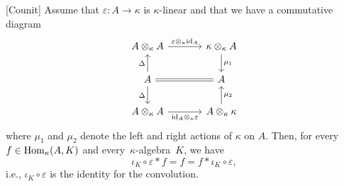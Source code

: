 \begin{lem}\label{lem:*-identity} {\rm[Counit]}
    Assume that\/ $\varepsilon\colon A\to\kappa$ is\/ $\kappa$-linear and that we have a commutative diagram
    \small
    \begin{equation}\label{dgm:*-identity}
        \begin{tikzcd}[column sep=1.2cm]
            A\otimes_\kappa A
                    \arrow[r,"\varepsilon\otimes_\kappa\id_A"]
                &\kappa\otimes_\kappa A
                    \arrow[d,"\mu_1"]\\
            A
                    \arrow[u,"\Delta"]
                    \arrow[d,"\Delta"']
                &A
                    \arrow[l,no head,equal]\\
            A\otimes_\kappa A
                    \arrow[r,"\id_A\otimes_\kappa\varepsilon"']
                &A\otimes_\kappa\kappa
                        \arrow[u,"\mu_2"']
        \end{tikzcd}
    \end{equation}
    \normalsize
    where $\mu_1$ and $\mu_2$ denote the left and right actions of\/ $\kappa$ on $A$. Then, for every\/ $f\in{\rm Hom}_\kappa(A,K)$ and every\/~$\kappa$-algebra\/~$K$, we have
    $$
        \iota_K\circ\varepsilon*f=f=f*\iota_K\circ\varepsilon,
    $$
    i.e., $\iota_K\circ\varepsilon$ is the identity for the convolution.
\end{lem}

